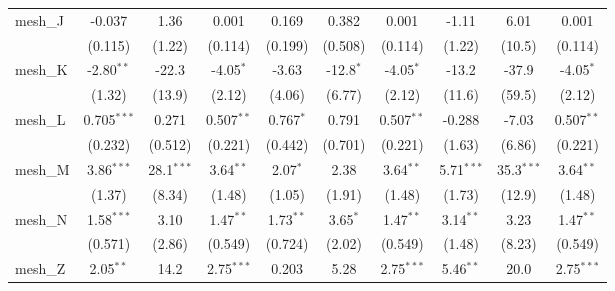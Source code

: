 \begin{tabular}{lccccccccc}
   mesh\_J                                                     & -0.037         & 1.36           & 0.001          & 0.169          & 0.382         & 0.001          & -1.11          & 6.01          & 0.001\\   
                                                               & (0.115)        & (1.22)         & (0.114)        & (0.199)        & (0.508)       & (0.114)        & (1.22)         & (10.5)        & (0.114)\\   
   mesh\_K                                                     & -2.80$^{**}$   & -22.3          & -4.05$^{*}$    & -3.63          & -12.8$^{*}$   & -4.05$^{*}$    & -13.2          & -37.9         & -4.05$^{*}$\\   
                                                               & (1.32)         & (13.9)         & (2.12)         & (4.06)         & (6.77)        & (2.12)         & (11.6)         & (59.5)        & (2.12)\\   
   mesh\_L                                                     & 0.705$^{***}$  & 0.271          & 0.507$^{**}$   & 0.767$^{*}$    & 0.791         & 0.507$^{**}$   & -0.288         & -7.03         & 0.507$^{**}$\\   
                                                               & (0.232)        & (0.512)        & (0.221)        & (0.442)        & (0.701)       & (0.221)        & (1.63)         & (6.86)        & (0.221)\\   
   mesh\_M                                                     & 3.86$^{***}$   & 28.1$^{***}$   & 3.64$^{**}$    & 2.07$^{*}$     & 2.38          & 3.64$^{**}$    & 5.71$^{***}$   & 35.3$^{***}$  & 3.64$^{**}$\\   
                                                               & (1.37)         & (8.34)         & (1.48)         & (1.05)         & (1.91)        & (1.48)         & (1.73)         & (12.9)        & (1.48)\\   
   mesh\_N                                                     & 1.58$^{***}$   & 3.10           & 1.47$^{**}$    & 1.73$^{**}$    & 3.65$^{*}$    & 1.47$^{**}$    & 3.14$^{**}$    & 3.23          & 1.47$^{**}$\\   
                                                               & (0.571)        & (2.86)         & (0.549)        & (0.724)        & (2.02)        & (0.549)        & (1.48)         & (8.23)        & (0.549)\\   
   mesh\_Z                                                     & 2.05$^{**}$    & 14.2           & 2.75$^{***}$   & 0.203          & 5.28          & 2.75$^{***}$   & 5.46$^{**}$    & 20.0          & 2.75$^{***}$\\   

\end{tabular}
